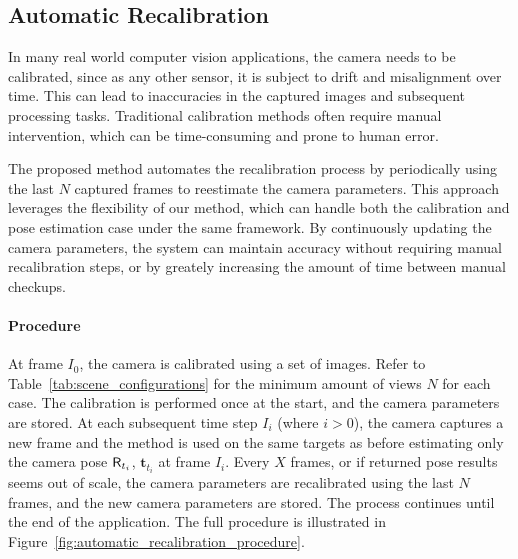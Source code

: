 \subsection{Automatic Recalibration}
\label{sec:automatic_recalibration}

In many real world computer vision applications, the camera needs to be calibrated, since as any other sensor, it is subject to drift and misalignment over time. This can lead to inaccuracies in the captured images and subsequent processing tasks. Traditional calibration methods often require manual intervention, which can be time-consuming and prone to human error.

The proposed method automates the recalibration process by periodically using the last $N$ captured frames to reestimate the camera parameters. This approach leverages the flexibility of our method, which can handle both the calibration and pose estimation case under the same framework. By continuously updating the camera parameters, the system can maintain accuracy without requiring manual recalibration steps, or by greately increasing the amount of time between manual checkups.

\paragraph{Procedure}
At frame $I_0$, the camera is calibrated using a set of images. Refer to Table~\ref{tab:scene_configurations} for the minimum amount of views $N$ for each case. The calibration is performed once at the start, and the camera parameters are stored. At each subsequent time step $I_i$ (where $i > 0$), the camera captures a new frame and the method is used on the same targets as before estimating only the camera pose $\mathsf{R}_{t_i}$, $\mathbf{t}_{t_i}$ at frame $I_i$. Every $X$ frames, or if returned pose results seems out of scale, the camera parameters are recalibrated using the last $N$ frames, and the new camera parameters are stored. The process continues until the end of the application.
The full procedure is illustrated in Figure~\ref{fig:automatic_recalibration_procedure}.

